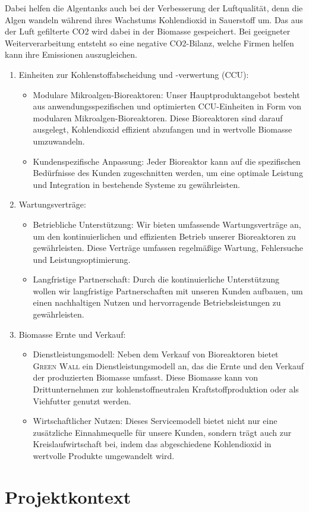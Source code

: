         Dabei helfen die Algentanks auch bei der Verbesserung der Luftqualität, denn die Algen wandeln während ihres Wachstums Kohlendioxid in Sauerstoff um.
        Das aus der Luft gefilterte CO2 wird dabei in der Biomasse gespeichert.
        Bei geeigneter Weiterverarbeitung entsteht so eine negative CO2-Bilanz, welche Firmen helfen kann ihre Emissionen auszugleichen.


        \begin{enumerate}
            \item Einheiten zur Kohlenstoffabscheidung und -verwertung (CCU):
            \begin{itemize}
                \item Modulare Mikroalgen-Bioreaktoren: Unser Hauptproduktangebot besteht aus anwendungsspezifischen und optimierten CCU-Einheiten in Form von modularen Mikroalgen-Bioreaktoren.
                Diese Bioreaktoren sind darauf ausgelegt, Kohlendioxid effizient abzufangen und in wertvolle Biomasse umzuwandeln.
                \item Kundenspezifische Anpassung: Jeder Bioreaktor kann auf die spezifischen Bedürfnisse des Kunden zugeschnitten werden, um eine optimale Leistung und Integration in bestehende Systeme zu gewährleisten.
            \end{itemize}
            \item Wartungsverträge:
            \begin{itemize}
                \item Betriebliche Unterstützung: Wir bieten umfassende Wartungsverträge an, um den kontinuierlichen und effizienten Betrieb unserer Bioreaktoren zu gewährleisten.
                Diese Verträge umfassen regelmäßige Wartung, Fehlersuche und Leistungsoptimierung.
                \item Langfristige Partnerschaft: Durch die kontinuierliche Unterstützung wollen wir langfristige Partnerschaften mit unseren Kunden aufbauen, um einen nachhaltigen Nutzen und hervorragende Betriebsleistungen zu gewährleisten.
            \end{itemize}
            \item Biomasse Ernte und Verkauf:
            \begin{itemize}
                \item Dienstleistungsmodell: Neben dem Verkauf von Bioreaktoren bietet \textsc{Green Wall} ein Dienstleistungsmodell an, das die Ernte und den Verkauf der produzierten Biomasse umfasst.
                Diese Biomasse kann von Drittunternehmen zur kohlenstoffneutralen Kraftstoffproduktion oder als Viehfutter genutzt werden.
                \item Wirtschaftlicher Nutzen: Dieses Servicemodell bietet nicht nur eine zusätzliche Einnahmequelle für unsere Kunden, sondern trägt auch zur Kreislaufwirtschaft bei, indem das abgeschiedene Kohlendioxid in wertvolle Produkte umgewandelt wird.
            \end{itemize}
        \end{enumerate}

    \section{Projektkontext}
